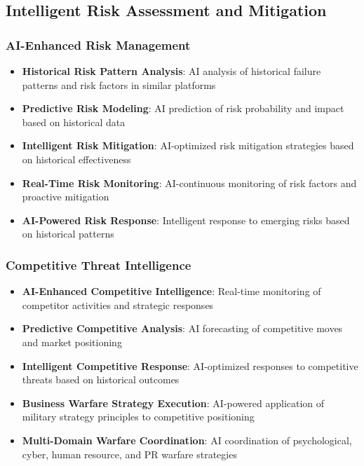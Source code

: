 \subsection{Intelligent Risk Assessment and Mitigation}

\subsubsection{AI-Enhanced Risk Management}

\begin{itemize}
    \item \textbf{Historical Risk Pattern Analysis}: AI analysis of historical failure patterns and risk factors in similar platforms
    \item \textbf{Predictive Risk Modeling}: AI prediction of risk probability and impact based on historical data
    \item \textbf{Intelligent Risk Mitigation}: AI-optimized risk mitigation strategies based on historical effectiveness
    \item \textbf{Real-Time Risk Monitoring}: AI-continuous monitoring of risk factors and proactive mitigation
    \item \textbf{AI-Powered Risk Response}: Intelligent response to emerging risks based on historical patterns
\end{itemize}

\subsubsection{Competitive Threat Intelligence}

\begin{itemize}
    \item \textbf{AI-Enhanced Competitive Intelligence}: Real-time monitoring of competitor activities and strategic responses
    \item \textbf{Predictive Competitive Analysis}: AI forecasting of competitive moves and market positioning
    \item \textbf{Intelligent Competitive Response}: AI-optimized responses to competitive threats based on historical outcomes
    \item \textbf{Business Warfare Strategy Execution}: AI-powered application of military strategy principles to competitive positioning
    \item \textbf{Multi-Domain Warfare Coordination}: AI coordination of psychological, cyber, human resource, and PR warfare strategies
\end{itemize}

